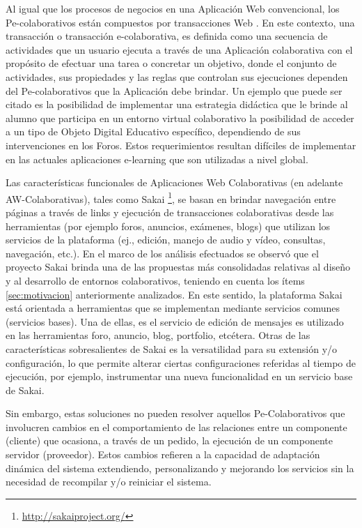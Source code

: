 Al igual que los procesos de negocios en una Aplicación Web convencional, los Pe-colaborativos están compuestos por transacciones Web \cite{cacic2007.7}. En este contexto, una transacción o transacción e-colaborativa, es definida como una secuencia de actividades que un usuario ejecuta a través de una Aplicación colaborativa con el propósito de efectuar una tarea o concretar un objetivo, donde el conjunto de actividades, sus propiedades y las reglas que controlan sus ejecuciones dependen del Pe-colaborativos que la Aplicación debe brindar. Un ejemplo que puede ser citado es la posibilidad de implementar una estrategia didáctica que le brinde al alumno que participa en un entorno virtual colaborativo la posibilidad de acceder a un tipo de Objeto Digital Educativo específico, dependiendo de sus intervenciones en los Foros. Estos requerimientos resultan difíciles de implementar en las actuales aplicaciones e-learning que son utilizadas a nivel global.

Las características funcionales de Aplicaciones Web Colaborativas (en adelante AW-Colaborativas), tales como Sakai \footnote{\url{http://sakaiproject.org/}}, se basan en brindar navegación entre páginas a través de links y ejecución de transacciones colaborativas desde las herramientas (por ejemplo foros, anuncios, exámenes, blogs) que utilizan los servicios de la plataforma (ej., edición, manejo de audio y vídeo, consultas, navegación, etc.).
En el marco de los análisis efectuados se observó que el proyecto Sakai brinda una de las propuestas más consolidadas relativas al diseño y al desarrollo de entornos colaborativos, teniendo en cuenta los ítems \ref{sec:motivacion} anteriormente analizados. En este sentido, la plataforma Sakai está orientada a herramientas que se implementan mediante servicios comunes (servicios bases). Una de ellas, es el servicio de edición de mensajes es utilizado en las herramientas foro, anuncio, blog, portfolio, etcétera. Otras de las características sobresalientes de Sakai es la versatilidad para su extensión y/o configuración, lo que permite alterar ciertas configuraciones  referidas al tiempo de ejecución, por ejemplo, instrumentar una nueva funcionalidad en un servicio base de Sakai.

Sin embargo, estas soluciones no pueden resolver aquellos Pe-Colaborativos que
involucren cambios en el comportamiento de las relaciones entre un componente
(cliente) que ocasiona, a través de un pedido, la ejecución de un componente
servidor (proveedor). Estos cambios refieren a la capacidad de
adaptación dinámica del sistema \cite{cacic2007.14} extendiendo, personalizando
y mejorando los servicios sin la necesidad de recompilar y/o reiniciar el
sistema. 

